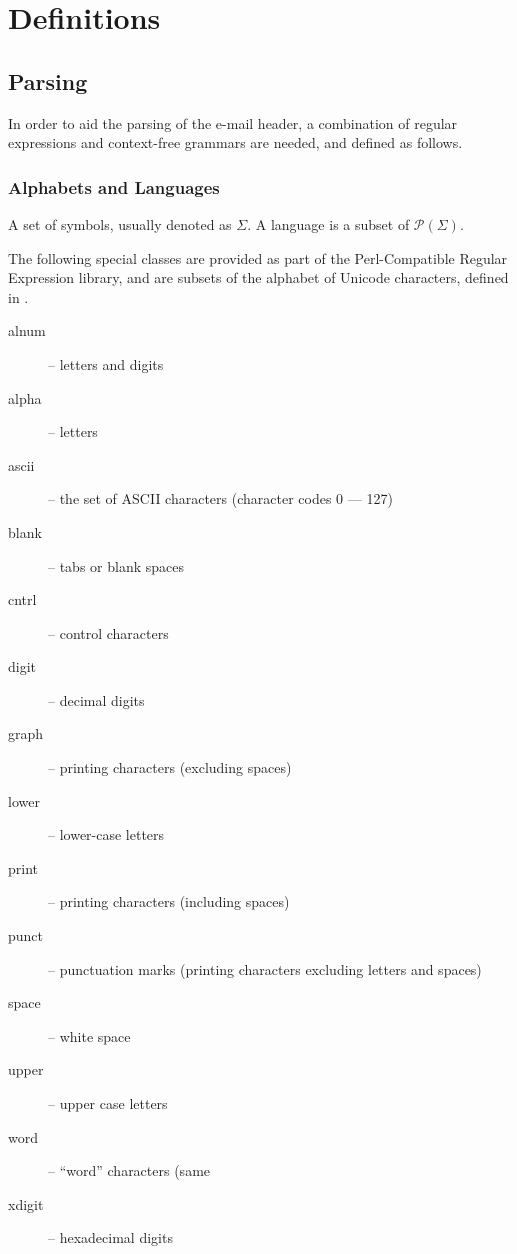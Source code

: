 \chapter{Definitions}
\section{Parsing}
In order to aid the parsing of the e-mail header, a combination of regular expressions and context-free grammars are needed, and defined as follows.
\subsection{Alphabets and Languages}
A set of symbols, usually denoted as $\Sigma$.  A language is a subset of $\mathcal P (\Sigma)$.

The following special classes are provided as part of the Perl-Compatible Regular Expression library, and are subsets of the alphabet of Unicode characters, defined in \cite{php_group_gutmans_lerdorf_suraski_boerger}.
\begin{description}
\item[alnum] -- letters and digits
\item[alpha] -- letters
\item[ascii] -- the set of ASCII characters (character codes 0 --- 127)
\item[blank] -- tabs or blank spaces
\item[cntrl] -- control characters
\item[digit] -- decimal digits
\item[graph] -- printing characters (excluding spaces)
\item[lower] -- lower-case letters
\item[print] -- printing characters (including spaces)
\item[punct] -- punctuation marks (printing characters excluding letters and spaces)
\item[space] -- white space
\item[upper] -- upper case letters
\item[word] -- ``word'' characters (same 
\item[xdigit] -- hexadecimal digits
\end{description}
